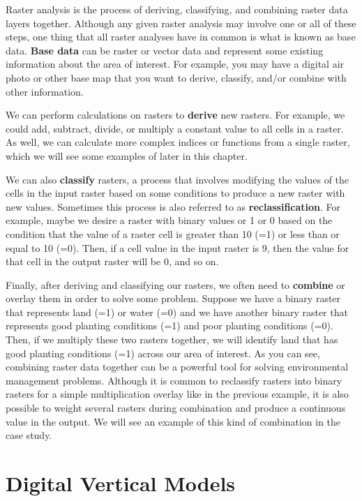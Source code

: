 \documentclass[
]{book}
\begin{document}
Raster analysis is the process of deriving, classifying, and combining raster data layers together. Although any given raster analysis may involve one or all of these steps, one thing that all raster analyses have in common is what is known as base data. \textbf{Base data} can be raster or vector data and represent some existing information about the area of interest. For example, you may have a digital air photo or other base map that you want to derive, classify, and/or combine with other information.

We can perform calculations on rasters to \textbf{derive} new rasters. For example, we could add, subtract, divide, or multiply a constant value to all cells in a raster. As well, we can calculate more complex indices or functions from a single raster, which we will see some examples of later in this chapter.

We can also \textbf{classify} rasters, a process that involves modifying the values of the cells in the input raster based on some conditions to produce a new raster with new values. Sometimes this process is also referred to as \textbf{reclassification}. For example, maybe we desire a raster with binary values or 1 or 0 based on the condition that the value of a raster cell is greater than 10 (=1) or less than or equal to 10 (=0). Then, if a cell value in the input raster is 9, then the value for that cell in the output raster will be 0, and so on.

Finally, after deriving and classifying our rasters, we often need to \textbf{combine} or overlay them in order to solve some problem. Suppose we have a binary raster that represents land (=1) or water (=0) and we have another binary raster that represents good planting conditions (=1) and poor planting conditions (=0). Then, if we multiply these two rasters together, we will identify land that has good planting conditions (=1) across our area of interest. As you can see, combining raster data together can be a powerful tool for solving environmental management problems. Although it is common to reclassify rasters into binary rasters for a simple multiplication overlay like in the previous example, it is also possible to weight several rasters during combination and produce a continuous value in the output. We will see an example of this kind of combination in the case study.

\section{Digital Vertical Models}\label{digital-vertical-models}
\end{document}
